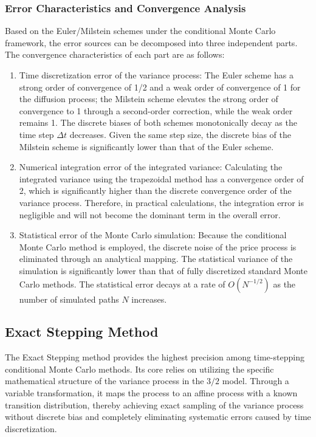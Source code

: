 \subsubsection{Error Characteristics and Convergence Analysis}
Based on the Euler/Milstein schemes under the conditional Monte Carlo framework, the error sources can be decomposed into three independent parts. The convergence characteristics of each part are as follows:
\begin{enumerate}
  \item Time discretization error of the variance process: The Euler scheme has a strong order of convergence of 1/2 and a weak order of convergence of 1 for the diffusion process; the Milstein scheme elevates the strong order of convergence to 1 through a second-order correction, while the weak order remains 1. The discrete biases of both schemes monotonically decay as the time step $\Delta t$ decreases. Given the same step size, the discrete bias of the Milstein scheme is significantly lower than that of the Euler scheme.
  \item Numerical integration error of the integrated variance: Calculating the integrated variance using the trapezoidal method has a convergence order of 2, which is significantly higher than the discrete convergence order of the variance process. Therefore, in practical calculations, the integration error is negligible and will not become the dominant term in the overall error.
  \item Statistical error of the Monte Carlo simulation: Because the conditional Monte Carlo method is employed, the discrete noise of the price process is eliminated through an analytical mapping. The statistical variance of the simulation is significantly lower than that of fully discretized standard Monte Carlo methods. The statistical error decays at a rate of $O(N^{-1/2})$ as the number of simulated paths $N$ increases.
\end{enumerate}

\subsection{Exact Stepping Method}
The Exact Stepping method provides the highest precision among time-stepping conditional Monte Carlo methods. Its core relies on utilizing the specific mathematical structure of the variance process in the $3/2$ model. Through a variable transformation, it maps the process to an affine process with a known transition distribution, thereby achieving exact sampling of the variance process without discrete bias and completely eliminating systematic errors caused by time discretization.

